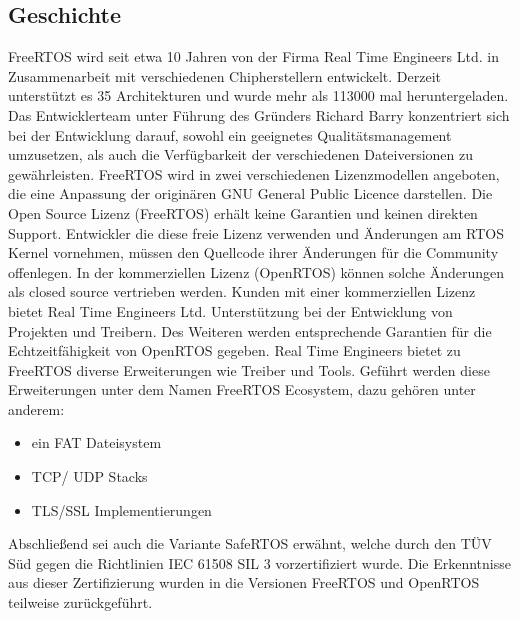 \subsection{Geschichte}
FreeRTOS wird seit etwa 10 Jahren von der Firma Real Time Engineers Ltd. in Zusammenarbeit mit verschiedenen Chipherstellern entwickelt. Derzeit unterstützt es 35 Architekturen und wurde mehr als 113000 mal heruntergeladen. Das Entwicklerteam unter Führung des Gründers Richard Barry konzentriert sich bei der Entwicklung darauf, sowohl ein geeignetes Qualitätsmanagement umzusetzen, als auch die Verfügbarkeit der verschiedenen Dateiversionen zu gewährleisten. FreeRTOS wird in zwei verschiedenen Lizenzmodellen angeboten, die eine Anpassung der originären GNU General Public Licence darstellen. Die Open Source Lizenz (FreeRTOS) erhält keine Garantien und keinen direkten Support. Entwickler die diese freie Lizenz verwenden und Än\-der\-ungen am RTOS Kernel vornehmen, müssen den Quellcode ihrer Än\-der\-ungen für die Community offenlegen. In der kommerziellen Lizenz (OpenRTOS) können solche Änderungen als closed source vertrieben werden. Kunden mit einer kommerziellen Lizenz bietet Real Time Engineers Ltd. Unterstützung bei der Entwicklung von Projekten und Treibern. Des Weiteren werden entsprechende Garantien für die Echt\-zeit\-fähig\-keit von OpenRTOS gegeben. Real Time Engineers bietet zu FreeRTOS diverse Erweiterungen wie Treiber und Tools. Geführt werden diese Erweiterungen unter dem Namen FreeRTOS Ecosystem, dazu gehören unter anderem:
\begin{itemize}
	\item ein FAT Dateisystem
	\item TCP/ UDP Stacks
	\item TLS/SSL Implementierungen
\end{itemize}
Abschließend sei auch die Variante SafeRTOS erwähnt, welche durch den TÜV Süd gegen die Richtlinien IEC 61508 SIL 3 vorzertifiziert wurde. Die Erkenntnisse aus dieser Zertifizierung wurden in die Versionen FreeRTOS und OpenRTOS teilweise zurückgeführt.
